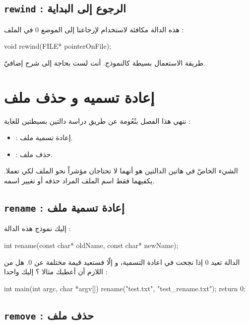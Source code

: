 \subsection{\texttt{rewind} : الرجوع إلى البداية}

هذه الدالة مكافئة لاستخدام
لإرجاعنا إلى الموضع 0 في الملف :

\begin{Csource}
void rewind(FILE* pointerOnFile);
\end{Csource}

طريقة الاستعمال بسيطة كالنموذج. أنت لست بحاجة إلى شرح إضافيّ.

\section{إعادة تسميه و حذف ملف}

ننهي هذا الفصل بنُعُومة عن طريق دراسة دالتين بسيطتين للغاية :

\begin{itemize}
  \item {} :
  إعادة تسمية ملف.
  \item {} :
  حذف ملف.
\end{itemize}

الشيء الخاصّ في هاتين الدالتين هو أنهما لا تحتاجان مؤشراً نحو الملف لكي تعملا. يكفيهما فقط اسم الملف المراد حذفه أو تغيير اسمه.

\subsection{\texttt{rename} : إعادة تسمية ملف}

إليك نموذج هذه الدالة :

\begin{Csource}
int rename(const char* oldName, const char* newName);
\end{Csource}

الدالة تعيد 0 إذا نجحت في اعادة التسمية،  و إلّا فستعيد قيمة مختلفة عن 0. هل من اللازم أن أعطيك مثالا ؟ إليك واحدا :

\begin{Csource}
int main(int argc, char *argv[])
{
    rename("test.txt", "test_rename.txt");
    return 0;
}
\end{Csource}

\subsection{\texttt{remove} : حذف ملف}

